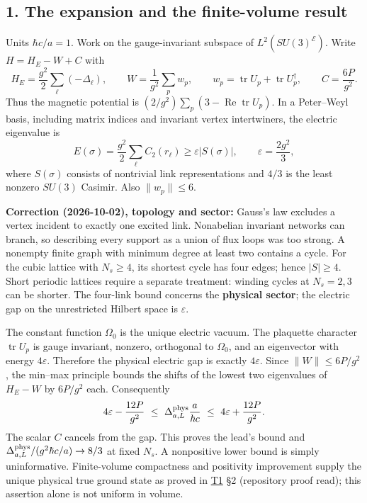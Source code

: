 \documentclass[11pt,a4paper]{article}
\begin{document}
\hypertarget{the-expansion-and-the-finite-volume-result}{%
\subsection{1. The expansion and the finite-volume
result}\label{the-expansion-and-the-finite-volume-result}}

Units \(\hbar c/a=1\). Work on the gauge-invariant subspace of
\(L^2(SU(3)^{\mathcal E})\). Write \(H=H_E-W+C\) with
\[H_E=\frac{g^2}{2}\sum_\ell(-\Delta_\ell),\qquad
W=\frac1{g^2}\sum_pw_p,\qquad
w_p=\operatorname{tr}U_p+\operatorname{tr}U_p^\dagger,\qquad C=\frac{6P}{g^2}.\]
Thus the magnetic potential is
\((2/g^2)\sum_p(3-\operatorname{Re}\operatorname{tr}U_p)\). In a
Peter--Weyl basis, including matrix indices and invariant vertex
intertwiners, the electric eigenvalue is
\[E(\sigma)=\frac{g^2}{2}\sum_\ell C_2(r_\ell)
\ge\varepsilon|S(\sigma)|,\qquad \varepsilon=\frac{2g^2}{3},\] where
\(S(\sigma)\) consists of nontrivial link representations and \(4/3\) is
the least nonzero \(SU(3)\) Casimir. Also \(\|w_p\|\le6\).

\textbf{Correction (2026-10-02), topology and sector:} Gauss's law
excludes a vertex incident to exactly one excited link. Nonabelian
invariant networks can branch, so describing every support as a union of
flux loops was too strong. A nonempty finite graph with minimum degree
at least two contains a cycle. For the cubic lattice with \(N_s\ge4\),
its shortest cycle has four edges; hence \(|S|\ge4\). Short periodic
lattices require a separate treatment: winding cycles at \(N_s=2,3\) can
be shorter. The four-link bound concerns the \textbf{physical sector};
the electric gap on the unrestricted Hilbert space is \(\varepsilon\).

The constant function \(\Omega_0\) is the unique electric vacuum. The
plaquette character \(\operatorname{tr}U_p\) is gauge invariant,
nonzero, orthogonal to \(\Omega_0\), and an eigenvector with energy
\(4\varepsilon\). Therefore the physical electric gap is exactly
\(4\varepsilon\). Since \(\|W\|\le6P/g^2\), the min--max principle
bounds the shifts of the lowest two eigenvalues of \(H_E-W\) by
\(6P/g^2\) each. Consequently
\[4\varepsilon-\frac{12P}{g^2}\ \le\ \Delta^{\rm phys}_{a,L}\frac{a}{\hbar c}
\ \le\ 4\varepsilon+\frac{12P}{g^2}.\] The scalar \(C\) cancels from the
gap. This proves the lead's bound and
\(\Delta^{\rm phys}_{a,L}/(g^2\hbar c/a)\to8/3\) at fixed \(N_s\). A
nonpositive lower bound is simply uninformative. Finite-volume
compactness and positivity improvement supply the unique physical true
ground state as proved in \href{mass-gap-obligations-lattice.md}{T1} §2
(repository proof read); this assertion alone is not uniform in volume.
\end{document}
